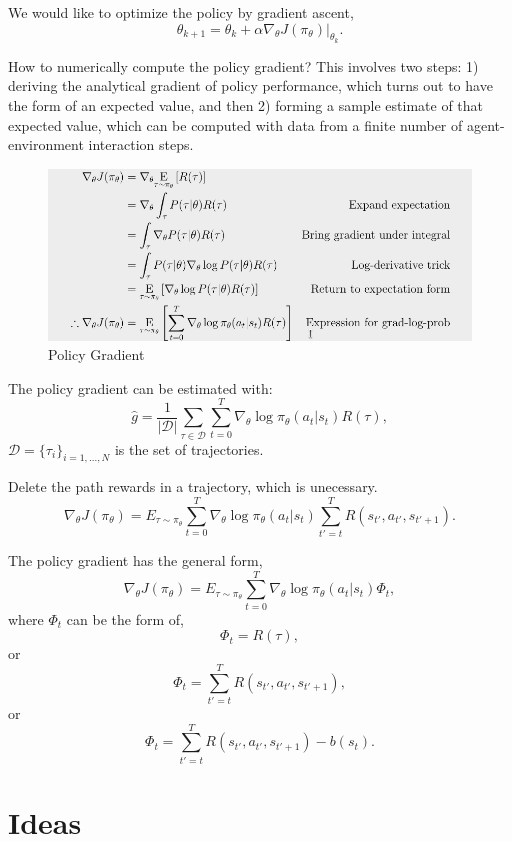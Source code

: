 \documentclass{article}
\begin{document}
    We would like to optimize the policy by gradient ascent, 
    $$
    \theta_{k+1} = \theta_k + \alpha \nabla_{\theta} J(\pi_{\theta})|_{\theta_k}.
    $$

    How to numerically compute the policy gradient? This involves two steps: 1) deriving the analytical gradient of policy performance, which turns out to have the form of an expected value, and then 2) forming a sample estimate of that expected value, which can be computed with data from a finite number of agent-environment interaction steps.
    \begin{figure}[H]
      \includegraphics[width=\linewidth]{derivative.png}
      \caption{Policy Gradient}
      \label{fig:policygradient}
    \end{figure}

    The policy gradient can be estimated with: 
    $$
    \hat{g} = \frac{1}{|\mathcal{D}|} \sum_{\tau \in \mathcal{D}} \sum_{t=0}^{T} \nabla_{\theta} \log \pi_{\theta}(a_t |s_t) R(\tau),
    $$
    $\mathcal{D} = \{\tau_i\}_{i=1,...,N}$ is the set of trajectories.

    Delete the path rewards in a trajectory, which is unecessary.
    $$
    \nabla_{\theta} J(\pi_{\theta}) = E_{\tau \sim \pi_{\theta}}{\sum_{t=0}^{T} \nabla_{\theta} \log \pi_{\theta}(a_t |s_t) \sum_{t'=t}^T R(s_{t'}, a_{t'}, s_{t'+1})}.
    $$

    The policy gradient has the general form, 
    $$
    \nabla_{\theta} J(\pi_{\theta}) = E_{\tau \sim \pi_{\theta}}{\sum_{t=0}^{T} \nabla_{\theta} \log \pi_{\theta}(a_t |s_t) \Phi_t},
    $$
    where $\Phi_t$ can be the form of, 
    $$
    \Phi_t = R(\tau),
    $$
    or 
    $$
    \Phi_t = \sum_{t'=t}^T R(s_{t'}, a_{t'}, s_{t'+1}),
    $$
    or 
    $$
    \Phi_t = \sum_{t'=t}^T R(s_{t'}, a_{t'}, s_{t'+1}) - b(s_t).
    $$
    

\section{Ideas}
\end{document}
